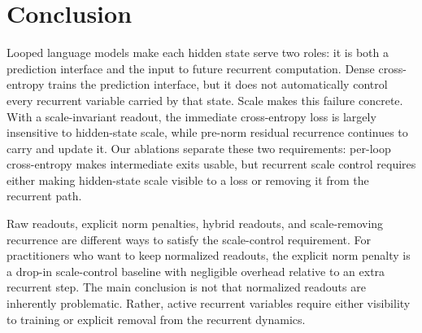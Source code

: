 \section{Conclusion}
\label{sec:conclusion}
Looped language models make each hidden state serve two roles: it is both a prediction interface and the input to future recurrent computation.
Dense cross-entropy trains the prediction interface, but it does not automatically control every recurrent variable carried by that state.
Scale makes this failure concrete.
With a scale-invariant readout, the immediate cross-entropy loss is largely insensitive to hidden-state scale, while pre-norm residual recurrence continues to carry and update it.
Our ablations separate these two requirements: per-loop cross-entropy makes intermediate exits usable, but recurrent scale control requires either making hidden-state scale visible to a loss or removing it from the recurrent path.

Raw readouts, explicit norm penalties, hybrid readouts, and scale-removing recurrence are different ways to satisfy the scale-control requirement.
For practitioners who want to keep normalized readouts, the explicit norm penalty is a drop-in scale-control baseline with negligible overhead relative to an extra recurrent step.
The main conclusion is not that normalized readouts are inherently problematic.
Rather, active recurrent variables require either visibility to training or explicit removal from the recurrent dynamics.
\FloatBarrier
